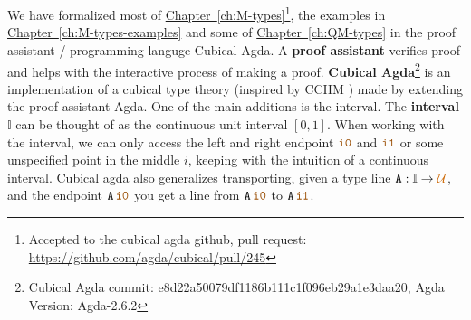 \documentclass[twoside,11pt,openright]{report}
\theoremstyle{plain} %
\theoremstyle{definition}
\theoremstyle{remark}
\newcommand*{\chapterref}[1]{\hyperref[ch:#1]{Chapter~\ref*{ch:#1}}}
\newcommand*{\universe}[1]{\textcolor{orange!80!black}{#1}}
\newcommand*{\constant}[1]{\textcolor{orange!60!black}{\ensuremath{\mathtt{#1}}}}
\newcommand*{\typeformer}[1]{\ensuremath{\mathtt{#1}}}
\begin{document}
\\ \\
We have formalized most of \chapterref{M-types}\footnote{Accepted to the cubical agda github, pull request: \url{https://github.com/agda/cubical/pull/245}}, the examples in \chapterref{M-types-examples} and some of \chapterref{QM-types} in the proof assistant / programming languge Cubical Agda. A \textbf{proof assistant} verifies proof and helps with the interactive process of making a proof. \textbf{Cubical Agda}\footnote{Cubical Agda commit: e8d22a50079df1186b111c1f096eb29a1e3daa20, Agda Version: Agda-2.6.2} \cite{cubicalagda} is an implementation of a cubical type theory (inspired by CCHM \cite{DBLP:CCHM}) made by extending the proof assistant Agda. One of the main additions is the interval. The \textbf{interval} \(\mathbb{I}\) can be thought of as the continuous unit interval \([0,1]\). When working with the interval, we can only access the left and right endpoint \(\constant{i0}\) and \(\constant{i1}\) or some unspecified point in the middle \(i\), keeping with the intuition of a continuous interval. Cubical agda also generalizes transporting, given a type line \(\typeformer{A} : \mathbb{I} \rightarrow \universe{\mathcal{U}}\), and the endpoint \(\typeformer{A}\,\constant{i0}\) you get a line from \(\typeformer{A}\,\constant{i0}\) to \(\typeformer{A}\,\constant{i1}\).
\end{document}
